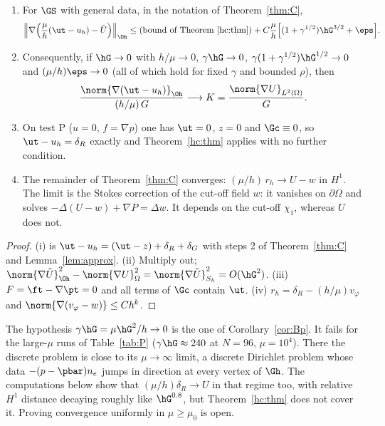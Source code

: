 \begin{corollary}\label{hc:cor}
\begin{enumerate}[label=(\roman*)]
\item For $\GS$ with general data, in the notation of Theorem~\ref{thm:C},
\[
\Bigl\|\nabla\Bigl(\frac\mu h(\ut-u_h)-\tilde U\Bigr)\Bigr\|_{\Oh}\le\text{(bound of Theorem~\ref{hc:thm})}
+C\frac\mu h\Bigl[(1+\gamma^{1/2})\hG^{3/2}+\eps\Bigr].
\]
\item Consequently, if $\hG\to0$ with $h/\mu\to0$, $\gamma\hG\to0$, $\gamma(1+\gamma^{1/2})\hG^{1/2}\to0$ and
$(\mu/h)\eps\to0$ (all of which hold for fixed $\gamma$ and bounded $\rho$), then
\[
\frac{\norm{\nabla(\ut-u_h)}_{\Oh}}{(h/\mu)\,G}\longrightarrow K=\frac{\norm{\nabla U}_{L^2(\Omega)}}{G}.
\]
\item On test P ($u=0$, $f=\nabla p$) one has $\ut=0$, $z=0$ and $\Gc\equiv0$, so $\ut-u_h=\delta_R$ exactly and
Theorem~\ref{hc:thm} applies with no further condition.
\item The remainder of Theorem~\ref{thm:C} converges: $(\mu/h)\,r_h\to U-w$ in $H^1$. The limit is the Stokes correction
of the cut-off field $w$: it vanishes on $\partial\Omega$ and solves $-\Delta(U-w)+\nabla P=\Delta w$. It depends on the
cut-off $\chi_1$, whereas $U$ does not.
\end{enumerate}
\end{corollary}

\begin{proof}
(i) is $\ut-u_h=(\ut-z)+\delta_R+\delta_G$ with steps 2 of Theorem~\ref{thm:C} and Lemma~\ref{lem:approx}. (ii) Multiply out;
$\norm{\nabla\tilde U}^2_{\Oh}-\norm{\nabla U}^2_{\Omega}=\norm{\nabla\tilde U}^2_{S_h}=O(\hG^2)$. (iii) $F=\ft-\nabla\pt=0$ and all terms of
$\Gc$ contain $\ut$. (iv) $r_h=\delta_R-(h/\mu)v_\varphi$ and $\norm{\nabla(v_\varphi-w)}\le Ch^k$.
\end{proof}

\begin{remark}\label{hc:regime}
The hypothesis $\gamma\hG=\mu\hG^2/h\to0$ is the one of Corollary~\ref{cor:Bp}. It fails for the large-$\mu$ runs of
Table~\ref{tab:P} ($\gamma\hG\approx240$ at $N=96$, $\mu=10^4$). There the discrete problem is close to its $\mu\to\infty$ limit,
a discrete Dirichlet problem whose data $-(p-\pbar)n_e$ jumps in direction at every vertex of $\Gh$. The computations below
show that $(\mu/h)\delta_R\to U$ in that regime too, with relative $H^1$ distance decaying roughly like $\hG^{0.8}$, but
Theorem~\ref{hc:thm} does not cover it. Proving convergence uniformly in $\mu\ge\mu_0$ is open.
\end{remark}

